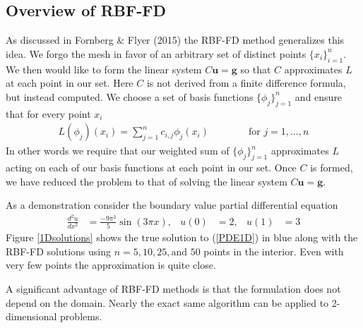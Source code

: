 \documentclass[12pt]{article}
\let\vec\mathbf
\begin{document}
\subsection{Overview of RBF-FD}	
As discussed in Fornberg \& Flyer (2015)\cite{Fornberg2015} the RBF-FD method generalizes this idea. We forgo the mesh in favor of an arbitrary set of distinct points $\{x_i\}_{i=1}^n$. We then would like to form the linear system $C\vec{u} = \vec{g}$ so that $C$ approximates $L$ at each point in our set. Here $C$ is not derived from a finite difference formula, but instead computed. We choose a set of basis functions $\{\phi_j\}_{j=1}^n$ and ensure that for every point $x_i$
\begin{align}
L(\phi_j)(x_i) = \sum\limits_{j=1}^{n} c_{i,j} \phi_j(x_i) \phantom{===} \text{for } j=1,...,n \label{row_coef}
\end{align}
In other words we require that our weighted sum of $\{\phi_j\}_{j=1}^n$ approximates $L$ acting on each of our basis functions at each point in our set. Once $C$ is formed, we have reduced the problem to that of solving the linear system $C\vec{u} = \vec{g}$. \bigbreak


As a demonstration consider the boundary value partial differential equation
\begin{align}
\frac{d^2u}{dx^2} &= \frac{-9\pi^2}{5}\sin(3\pi x), & u(0)&=2, & u(1)&=3 \label{PDE1D}
\end{align}
Figure \ref{1Dsolutions} shows the true solution to (\ref{PDE1D}) in blue along with the RBF-FD solutions using $n=5,10,25, \text{and } 50$ points in the interior. Even with very few points the approximation is quite close. \bigbreak

A significant advantage of RBF-FD methods is that the formulation does not depend on the domain. Nearly the exact same algorithm can be applied to 2-dimensional problems. \bigbreak
\end{document}

